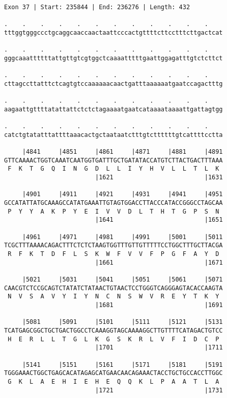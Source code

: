 \documentclass{article}
\begin{document}
\begin{Verbatim}
Exon 37 | Start: 235844 | End: 236276 | Length: 432
 
.    .    .    .    .    .    .    .    .    .    .    .    
tttggtgggccctgcaggcaaccaactaattcccactgttttcttcctttcttgactcat
  
.    .    .    .    .    .    .    .    .    .    .    .    
gggcaaattttttattgttgtcgtggctcaaaatttttgaattggagatttgtctcttct
  
.    .    .    .    .    .    .    .    .    .    .    .    
cttagccttatttctcagtgtccaaaaaacaactgatttaaaaaatgaatccagactttg
  
.    .    .    .    .    .    .    .    .    .    .    .    
aagaattgttttatattattctctctagaaaatgaatcataaaataaaattgattagtgg
  
.    .    .    .    .    .    .    .    .    .    .    .    
catctgtatatttattttaaacactgctaataatctttgtcttttttgtcattttcctta
  
     |4841     |4851     |4861     |4871     |4881     |4891
GTTCAAAACTGGTCAAATCAATGGTGATTTGCTGATATACCATGTCTTACTGACTTTAAA
 F  K  T  G  Q  I  N  G  D  L  L  I  Y  H  V  L  L  T  L  K 
                         |1621                         |1631
  
     |4901     |4911     |4921     |4931     |4941     |4951
GCCATATTATGCAAAGCCATATGAAATTGTAGTGGACCTTACCCATACCGGGCCTAGCAA
 P  Y  Y  A  K  P  Y  E  I  V  V  D  L  T  H  T  G  P  S  N 
                         |1641                         |1651
  
     |4961     |4971     |4981     |4991     |5001     |5011
TCGCTTTAAAACAGACTTTCTCTCTAAGTGGTTTGTTGTTTTTCCTGGCTTTGCTTACGA
 R  F  K  T  D  F  L  S  K  W  F  V  V  F  P  G  F  A  Y  D 
                         |1661                         |1671
  
     |5021     |5031     |5041     |5051     |5061     |5071
CAACGTCTCCGCAGTCTATATCTATAACTGTAACTCCTGGGTCAGGGAGTACACCAAGTA
 N  V  S  A  V  Y  I  Y  N  C  N  S  W  V  R  E  Y  T  K  Y 
                         |1681                         |1691
  
     |5081     |5091     |5101     |5111     |5121     |5131
TCATGAGCGGCTGCTGACTGGCCTCAAAGGTAGCAAAAGGCTTGTTTTCATAGACTGTCC
 H  E  R  L  L  T  G  L  K  G  S  K  R  L  V  F  I  D  C  P 
                         |1701                         |1711
  
     |5141     |5151     |5161     |5171     |5181     |5191
TGGGAAACTGGCTGAGCACATAGAGCATGAACAACAGAAACTACCTGCTGCCACCTTGGC
 G  K  L  A  E  H  I  E  H  E  Q  Q  K  L  P  A  A  T  L  A 
                         |1721                         |1731
  

\end{Verbatim}
\end{document}
